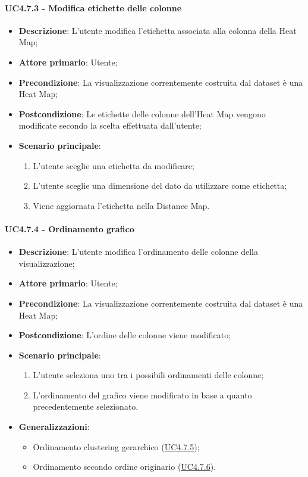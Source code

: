 \paragraph{UC4.7.3 - Modifica etichette delle colonne}
\label{par:uc4.7.4}
\begin{itemize}
    \item \textbf{Descrizione}:     L'utente modifica l'etichetta associata alla colonna della Heat Map;
    \item \textbf{Attore primario}: Utente;
    \item \textbf{Precondizione}:   La visualizzazione correntemente costruita dal dataset è una Heat Map;
    \item \textbf{Postcondizione}:  Le etichette delle colonne dell'Heat Map vengono modificate secondo la scelta effettuata dall'utente;
    \item \textbf{Scenario principale}:
    \begin{enumerate}
        \item L'utente sceglie una etichetta da modificare;
        \item L'utente sceglie una dimensione del dato da utilizzare come etichetta;
        \item Viene aggiornata l'etichetta nella Distance Map.
    \end{enumerate}
\end{itemize}

\paragraph{UC4.7.4 - Ordinamento grafico}
\label{par:uc4.7.5}
\begin{itemize}
    \item \textbf{Descrizione}:     L'utente modifica l'ordinamento delle colonne della visualizzazione;
    \item \textbf{Attore primario}: Utente;
    \item \textbf{Precondizione}:   La visualizzazione correntemente costruita dal dataset è una Heat Map;
    \item \textbf{Postcondizione}:  L'ordine delle colonne viene modificato;
    \item \textbf{Scenario principale}:
    \begin{enumerate}
        \item L'utente seleziona uno tra i possibili ordinamenti delle colonne;
        \item L'ordinamento del grafico viene modificato in base a quanto precedentemente selezionato.
    \end{enumerate}
    \item \textbf{Generalizzazioni}:
    \begin{itemize}
        \item Ordinamento clustering gerarchico (\hyperref[spar:uc4.7.5]{UC4.7.5});
        \item Ordinamento secondo ordine originario (\hyperref[spar:uc4.7.6]{UC4.7.6}).
    \end{itemize}
\end{itemize}

